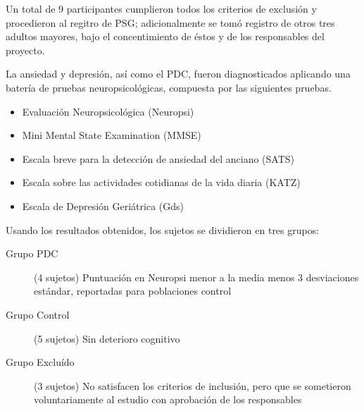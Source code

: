 \documentclass[12pt,a4paper]{mitthesis}
\begin{document}
Un total de 9 participantes cumplieron todos los criterios de exclusi\'on y procedieron al regitro 
de PSG; adicionalmente se tom\'o registro de otros tres adultos mayores, bajo
el concentimiento de \'estos y de los responsables del proyecto.

La ansiedad y depresi\'on, as\'i como el PDC, fueron diagnosticados aplicando una bater\'ia de
pruebas neuropsicol\'ogicas, compuesta por las siguientes pruebas. 
%
%
%

\begin{itemize}
\item {Evaluaci\'on Neuropsicol\'ogica (Neuropsi)} \cite{Solis03}
\item {Mini Mental State Examination (MMSE)} \cite{Velasco15}
\item {Escala breve para la detecci\'on de ansiedad del anciano (SATS)} \cite{Vargas11}
\item {Escala sobre las actividades cotidianas de la vida diaria (KATZ)} \cite{Roumec14}
\item {Escala de Depresi\'on Geri\'atrica (Gds)} \cite{Greenberg12,Cuijpers13}
\end{itemize}

Usando los resultados obtenidos, los sujetos se dividieron en tres grupos:
\begin{description}
\item[Grupo PDC] (4 sujetos) Puntuaci\'on en Neuropsi menor a la media menos 3 desviaciones est\'andar, 
reportadas para poblaciones control \cite{Solis03}
\item[Grupo Control] (5 sujetos) Sin deterioro cognitivo
\item[Grupo Exclu\'ido] (3 sujetos) No satisfacen los criterios de inclusi\'on, pero que se 
sometieron voluntariamente al estudio con aprobaci\'on de los responsables
\end{description}
\end{document}

